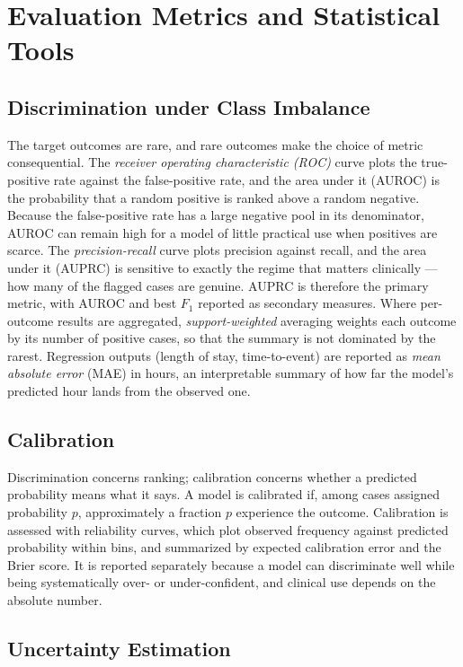 \section{Evaluation Metrics and Statistical Tools}
\label{sec:prelim-eval}

\subsection{Discrimination under Class Imbalance}

The target outcomes are rare, and rare outcomes make the choice of metric consequential. The \emph{receiver operating characteristic (ROC)} curve plots the true-positive rate against the false-positive rate, and the area under it (AUROC) is the probability that a random positive is ranked above a random negative. Because the false-positive rate has a large negative pool in its denominator, AUROC can remain high for a model of little practical use when positives are scarce. The \emph{precision-recall} curve plots precision against recall, and the area under it (AUPRC) is sensitive to exactly the regime that matters clinically --- how many of the flagged cases are genuine. AUPRC is therefore the primary metric, with AUROC and best $F_1$ reported as secondary measures. Where per-outcome results are aggregated, \emph{support-weighted} averaging weights each outcome by its number of positive cases, so that the summary is not dominated by the rarest. Regression outputs (length of stay, time-to-event) are reported as \emph{mean absolute error} (MAE) in hours, an interpretable summary of how far the model's predicted hour lands from the observed one.

\subsection{Calibration}

Discrimination concerns ranking; calibration concerns whether a predicted probability means what it says. A model is calibrated if, among cases assigned probability $p$, approximately a fraction $p$ experience the outcome. Calibration is assessed with reliability curves, which plot observed frequency against predicted probability within bins, and summarized by expected calibration error and the Brier score. It is reported separately because a model can discriminate well while being systematically over- or under-confident, and clinical use depends on the absolute number.

\subsection{Uncertainty Estimation}

